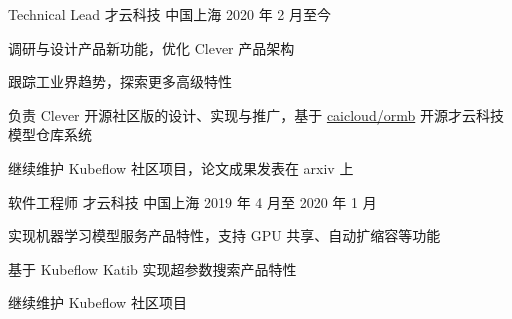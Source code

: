 

\begin{cventries}

  \cventry
    {Technical Lead} %
    {才云科技} %
    {中国上海} %
    {2020 年 2 月至今} %
    {
      \begin{cvitems} %
        \item 调研与设计产品新功能，优化 Clever 产品架构
        \item 跟踪工业界趋势，探索更多高级特性
        \item 负责 Clever 开源社区版的设计、实现与推广，基于 \href{https://github.com/caicloud/ormb}{caicloud/ormb} 开源才云科技模型仓库系统
        \item 继续维护 Kubeflow 社区项目，论文成果发表在 arxiv 上
      \end{cvitems}
    }

  \cventry
    {软件工程师} %
    {才云科技} %
    {中国上海} %
    {2019 年 4 月至 2020 年 1 月} %
    {
      \begin{cvitems} %
        \item 实现机器学习模型服务产品特性，支持 GPU 共享、自动扩缩容等功能
        \item 基于 Kubeflow Katib 实现超参数搜索产品特性
        \item 继续维护 Kubeflow 社区项目
      \end{cvitems}
    }


\end{cventries}
